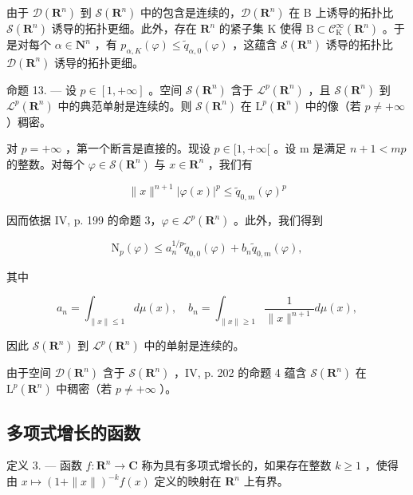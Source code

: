 由于 \(\mathcal{D}(\mathbf{R}^{n})\) 到 \(\mathcal{S}(\mathbf{R}^{n})\) 中的包含是连续的，\(\mathcal{D}(\mathbf{R}^{n})\) 在 B 上诱导的拓扑比 \(\mathcal{S}(\mathbf{R}^{n})\) 诱导的拓扑更细。此外，存在 \(\mathbf{R}^{n}\) 的紧子集 K 使得 \(\mathrm{B} \subset \mathcal{C}_{\mathrm{K}}^{\infty}(\mathbf{R}^{n})\) 。于是对每个 \(\alpha \in \mathbf{N}^{n}\) ，有 \(p_{\alpha,K}(\varphi) \leqslant \widetilde{q}_{\alpha,0}(\varphi)\) ，这蕴含 \(\mathcal{S}(\mathbf{R}^{n})\) 诱导的拓扑比 \(\mathcal{D}(\mathbf{R}^{n})\) 诱导的拓扑更细。

命题 13. --- 设 \(p \in [1, +\infty]\) 。空间 \(\mathcal{S}(\mathbf{R}^{n})\) 含于 \(\mathcal{L}^{p}(\mathbf{R}^{n})\) ，且 \(\mathcal{S}(\mathbf{R}^{n})\) 到 \(\mathcal{L}^{p}(\mathbf{R}^{n})\) 中的典范单射是连续的。则 \(\mathcal{S}(\mathbf{R}^{n})\) 在 \(\mathrm{L}^{p}(\mathbf{R}^{n})\) 中的像（若 \(p \neq +\infty\) ）稠密。

对 \(p = +\infty\) ，第一个断言是直接的。现设 \(p \in [1, +\infty[\) 。设 m 是满足 \(n + 1 < mp\) 的整数。对每个 \(\varphi \in \mathcal{S}(\mathbf{R}^{n})\) 与 \(x \in \mathbf{R}^{n}\) ，我们有

\[
\| x \| ^ {n + 1} | \varphi (x) | ^ {p} \leqslant \widetilde {q} _ {0, m} (\varphi) ^ {p}
\]

因而依据 IV, p. 199 的命题 3，\(\varphi \in \mathcal{L}^p (\mathbf{R}^n)\) 。此外，我们得到

\[
\mathrm{N} _ {p} (\varphi) \leqslant a _ {n} ^ {1 / p} \widetilde {q} _ {0, 0} (\varphi) + b _ {n} \widetilde {q} _ {0, m} (\varphi),
\]

其中

\[
a _ {n} = \int_ {\| x \| \leqslant 1} d \mu (x), \quad b _ {n} = \int_ {\| x \| \geqslant 1} \frac {1}{\| x \| ^ {n + 1}} d \mu (x),
\]

因此 \(\mathcal{S}(\mathbf{R}^n)\) 到 \(\mathcal{L}^p (\mathbf{R}^n)\) 中的单射是连续的。

由于空间 \(\mathcal{D}(\mathbf{R}^n)\) 含于 \(\mathcal{S}(\mathbf{R}^n)\) ，IV, p. 202 的命题 4 蕴含 \(\mathcal{S}(\mathbf{R}^n)\) 在 \(\mathrm{L}^p (\mathbf{R}^n)\) 中稠密（若 \(p\neq +\infty\) ）。

\subsection{多项式增长的函数}

定义 3. --- 函数 \(f\colon\mathbf{R}^{n}\to\mathbf{C}\) 称为具有多项式增长的，如果存在整数 \(k\geqslant1\) ，使得由 \(x\mapsto(1+\|x\|)^{-k}f(x)\) 定义的映射在 \(\mathbf{R}^{n}\) 上有界。

